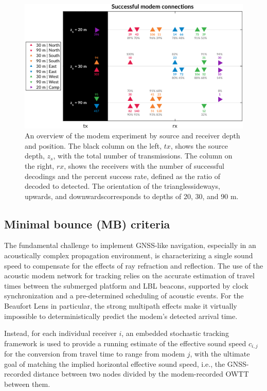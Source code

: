 \documentclass[preprint,TurnOnLineNumbers]{JASA}
\newcommand{\llabel}[1]{\hypertarget{llineno:#1}{\linelabel{#1}}}
\begin{document}
\begin{figure}[!ht]
  \centering
  \includegraphics[width=\columnwidth]{Fig4.pdf}
  \caption{An overview of the modem experiment by source and receiver depth and position. The black column on the left, $tx$, shows the source depth, $z_s$, with the total number of transmissions. The column on the right, $rx$, shows the receivers with the number of successful decodings and the percent success rate, defined as the ratio of decoded to detected. The orientation of the triangles\textemdash sideways, upwards, and downwards\textemdash corresponds to depths of 20, 30, and 90 m.}
  \label{fig:overview}
  \end{figure}

\subsection{Minimal bounce (MB) criteria}

\llabel{1.5} The fundamental challenge to implement GNSS-like navigation, especially in an acoustically complex propagation environment, is characterizing a single sound speed to compensate for the effects of ray refraction and reflection.
The use of the acoustic modem network for tracking relies on the accurate estimation of travel times between the submerged platform and LBL beacons, supported by clock synchronization and a pre-determined scheduling of acoustic events.
\llabel{2.9} For the Beaufort Lens in particular, the strong multipath effects make it virtually impossible to deterministically predict the modem's detected arrival time.

Instead, for each individual receiver $i$, an embedded stochastic tracking framework is used to provide a running estimate of the effective sound speed $c_{i,j}$ for the conversion from travel time to range from modem $j$, with the ultimate goal of matching the implied horizontal effective sound speed, i.e., the GNSS-recorded distance between two nodes divided by the modem-recorded OWTT between them. 
\end{document}
